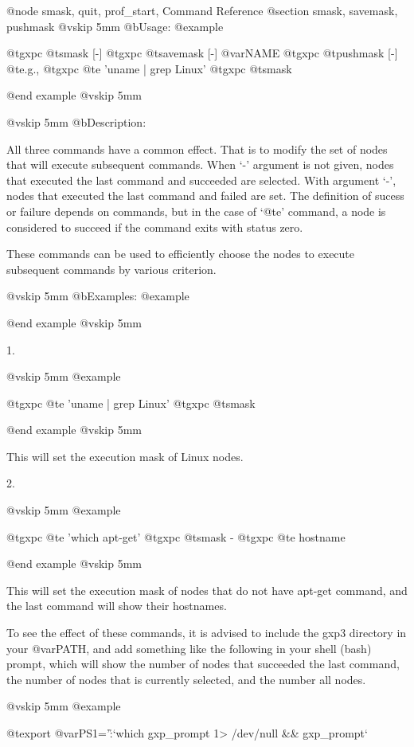 @node smask, quit, prof_start, Command Reference
@section smask, savemask, pushmask
@vskip 5mm
@b{Usage:}
@example

  @t{gxpc} @t{smask}    [-]
  @t{gxpc} @t{savemask} [-] @var{NAME}
  @t{gxpc} @t{pushmask} [-]
  @t{e}.g.,
  @t{gxpc}  @t{e}  'uname | grep Linux'
  @t{gxpc}  @t{smask}

@end example
@vskip 5mm

@vskip 5mm
@b{Description:}


  All three commands have a common effect. That is to modify the
set of nodes that will execute subsequent commands.  When `-'
argument is not given, nodes that executed the last command and
succeeded are selected. With argument `-', nodes that executed
the last command and failed are set. The definition of sucess or
failure depends on commands, but in the case of `@t{e}' command, a
node is considered to succeed if the command exits with status
zero.

These commands can be used to efficiently choose the nodes
to execute subsequent commands by various criterion.

@vskip 5mm
@b{Examples:}
@example


@end example
@vskip 5mm

1.

@vskip 5mm
@example

  @t{gxpc}  @t{e}  'uname | grep Linux'
  @t{gxpc}  @t{smask}

@end example
@vskip 5mm

This will set the execution mask of Linux nodes.

2.

@vskip 5mm
@example

  @t{gxpc}  @t{e}  'which apt-get'
  @t{gxpc}  @t{smask}  -
  @t{gxpc}  @t{e}  hostname

@end example
@vskip 5mm

This will set the execution mask of nodes that do not have apt-get
command, and the last command will show their hostnames.

To see the effect of these commands, it is advised to include the
gxp3 directory in your @var{PATH}, and add something like the following
in your shell (bash) prompt, which will show the number of nodes
that succeeded the last command, the number of nodes that is
currently selected, and the number all nodes.

@vskip 5mm
@example

  @t{export} @var{PS1}='\h:\W`which gxp_prompt 1> /dev/null && gxp_prompt`%

